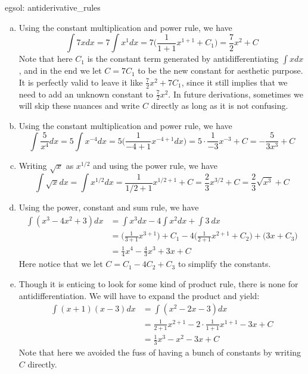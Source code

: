 \begin{egsol}[]{egsol: antiderivative_rules}
    \begin{enumerate}[a)]
        \item Using the constant multiplication and power rule, we have
        \[\int 7x dx = 7 \int x^1 dx = 7 \Big(\frac{1}{1+1}x^{1+1} + C_1\Big) = \frac{7}{2}x^2 + C\]  Note that here $C_1$ is the constant term generated by antidifferentiating $\int x dx$, and in the end we let $C = 7C_1$ to be the new constant for aesthetic purpose.  It is perfectly valid to leave it like $\frac{7}{2}x^2 + 7C_1$, since it still implies that we need to add an unknown constant to $\frac{7}{2}x^2$.  In future derivations, sometimes we will skip these nuances and write $C$ directly as long as it is not confusing.
        \item Using the constant multiplication and power rule, we have
        \[\int \frac{5}{x^4} dx = 5\int x^{-4} dx = 5 \Big(\frac{1}{-4+1} x^{-4+1} dx\Big) = 5\cdot\frac{1}{-3} x^{-3} + C = -\frac{5}{3x^3} + C\]
        \item Writing $\sqrt{x}$ as $x^{1/2}$ and using the power rule, we have
        \[\int \sqrt{x} dx = \int x^{1/2} dx = \frac{1}{1/2+1}x^{1/2+1} + C = \frac{2}{3}x^{3/2} + C= \frac{2}{3}\sqrt{x^3} + C\]
        \item Using the power, constant and sum rule, we have
        \begin{align*}
            \int (x^3 - 4x^2 + 3) dx &= \int x^3 dx - 4 \int x^2 dx + \int 3~dx\\
            &= \Big(\frac{1}{3+1} x^{3+1}\Big) + C_1 - 4 \Big(\frac{1}{2+1}x^{2+1} + C_2\Big) + \Big(3x + C_3\Big)\\
            &= \frac{1}{4}x^4 - \frac{4}{3}x^3 + 3x + C
        \end{align*}
        Here notice that we let $C = C_1 - 4C_2 + C_3$ to simplify the constants.
        \item Though it is enticing to look for some kind of product rule, there is none for antidifferentiation.  We will have to expand the product and yield:
        \begin{align*}
            \int (x+1)(x-3) dx &= \int (x^2-2x-3) dx\\
            &= \frac{1}{2+1}x^{2+1} - 2 \cdot \frac{1}{1+1}x^{1+1} - 3x + C\\
            &= \frac{1}{3}x^3 - x^2 - 3x + C
        \end{align*}
        Note that here we avoided the fuss of having a bunch of constants by writing $C$ directly.

\end{enumerate}
\end{egsol}
